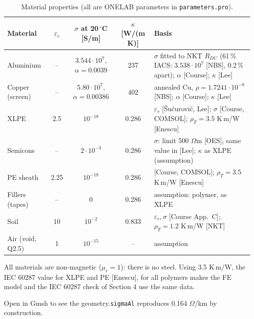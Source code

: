 \begin{center}
\end{center}

\begin{table}[H]\centering\small
\caption{Material properties (all are ONELAB parameters in \texttt{parameters.pro}).}
\begin{tabularx}{\linewidth}{@{}l c c c Y@{}}
\toprule Material & \(\varepsilon_r\) & \(\sigma\) at 20\,\(^\circ\)C [S/m] & \(\kappa\) [W/(m K)] & Basis\\\midrule
Aluminium & -- & \(3.544\cdot10^7\), \(\alpha=0.0039\) & 237 & \(\sigma\) fitted to NKT \(R_{DC}\) (61\,\% IACS: \(3.538\cdot10^7\) [NBS], 0.2\,\% apart); \(\alpha\) [Course]; \(\kappa\) [Lee]\\
Copper (screen) & -- & \(5.80\cdot10^7\), \(\alpha=0.00386\) & 402 & annealed Cu, \(\rho=1.7241\cdot10^{-8}\) [NBS]; \(\alpha\) [Course]; \(\kappa\) [Lee]\\
XLPE & 2.5 & \(10^{-18}\) & 0.286 & \(\varepsilon_r\) [\v{S}u\'{c}urovi\'{c}, Lee]; \(\sigma\) [Course, COMSOL]; \(\rho_T=3.5\) K\,m/W [Enescu]\\
Semicons & -- & \(2\cdot10^{-3}\) & 0.286 & \(\sigma\): limit 500 \(\Omega\)m [OES], same value in [Lee]; \(\kappa\) as XLPE (assumption)\\
PE sheath & 2.25 & \(10^{-18}\) & 0.286 & [Course, COMSOL]; \(\rho_T=3.5\) K\,m/W [Enescu]\\
Fillers (tapes) & -- & 0 & 0.286 & assumption: polymer, as XLPE\\
Soil & 10 & \(10^{-2}\) & 0.833 & \(\varepsilon_r,\sigma\) [Course App.~C]; \(\rho_T=1.2\) K\,m/W [NKT]\\
Air (void, Q2.5) & 1 & \(10^{-15}\) & -- & assumption\\
\bottomrule
\end{tabularx}
\end{table}
All materials are non-magnetic (\(\mu_r=1\)): there is no steel. Using 3.5 K\,m/W, the IEC 60287 value for
XLPE and PE [Enescu], for all polymers makes the FE model and the IEC 60287 check of Section 4 use the same data.

{Open  in Gmsh to see the geometry.}{\texttt{sigmaAl} reproduces 0.164 \(\Omega\)/km by construction.}

